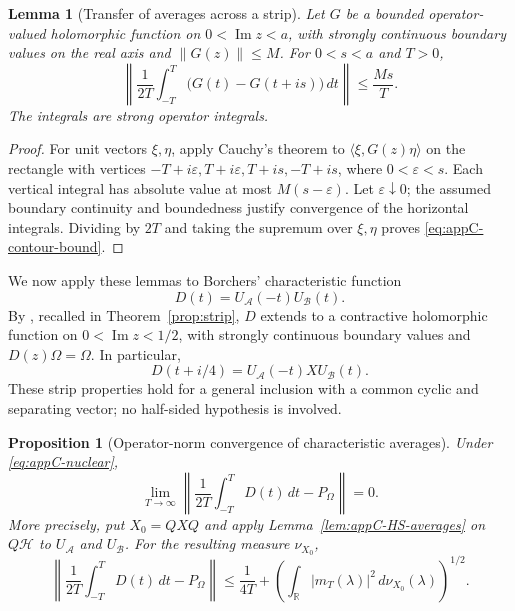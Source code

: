 \documentclass[a4paper,11pt]{article}
\newtheorem{lemma}[theorem]{Lemma}
\newtheorem{proposition}[theorem]{Proposition}
\theoremstyle{definition}
\begin{document}
\begin{lemma}[Transfer of averages across a strip]\label{lem:appC-strip-averages}
Let $G$ be a bounded operator-valued holomorphic function on $0<\operatorname{Im}z<a$, with strongly continuous boundary values on the real axis and $\|G(z)\|\le M$. For $0<s<a$ and $T>0$,
\begin{equation}
 \left\|\frac1{2T}\int_{-T}^{T}
 \bigl(G(t)-G(t+is)\bigr)\,dt\right\|\le\frac{Ms}{T}.
 \label{eq:appC-contour-bound}
\end{equation}
The integrals are strong operator integrals.
\end{lemma}

\begin{proof}
For unit vectors $\xi,\eta$, apply Cauchy's theorem to
$\langle\xi,G(z)\eta\rangle$ on the rectangle with vertices
$-T+i\varepsilon,T+i\varepsilon,T+is,-T+is$, where $0<\varepsilon<s$.
Each vertical integral has absolute value at most $M(s-\varepsilon)$.
Let $\varepsilon\downarrow0$; the assumed boundary continuity and boundedness justify convergence of the horizontal integrals. Dividing by $2T$ and taking the supremum over $\xi,\eta$ proves \eqref{eq:appC-contour-bound}.
\end{proof}

We now apply these lemmas to Borchers' characteristic function
\begin{equation}
 D(t)=U_{\mathcal A}(-t)U_{\mathcal B}(t).
 \label{eq:appC-characteristic}
\end{equation}
By \cite[Theorem~A in Section~II.2 and Lemma~II.3.2]{revolutionizing}, recalled in Theorem~\ref{prop:strip}, $D$ extends to a contractive holomorphic function on $0<\operatorname{Im}z<1/2$, with strongly continuous boundary values and $D(z)\Omega=\Omega$. In particular,
\begin{equation}
 D(t+i/4)=U_{\mathcal A}(-t)XU_{\mathcal B}(t).
 \label{eq:appC-shifted-characteristic}
\end{equation}
These strip properties hold for a general inclusion with a common cyclic and separating vector; no half-sided hypothesis is involved.

\begin{proposition}[Operator-norm convergence of characteristic averages]
\label{prop:appC-characteristic-mean}
Under \eqref{eq:appC-nuclear},
\begin{equation}
 \lim_{T\to\infty}
 \left\|\frac1{2T}\int_{-T}^{T}D(t)\,dt-P_\Omega\right\|=0 .
 \label{eq:appC-characteristic-mean}
\end{equation}
More precisely, put $X_0=QXQ$ and apply Lemma~\ref{lem:appC-HS-averages} on $Q\mathcal H$ to $U_{\mathcal A}$ and $U_{\mathcal B}$. For the resulting measure $\nu_{X_0}$,
\begin{equation}
 \left\|\frac1{2T}\int_{-T}^{T}D(t)\,dt-P_\Omega\right\|
 \le \frac1{4T}
 +\left(\int_{\mathbb R}|m_T(\lambda)|^2\,d\nu_{X_0}(\lambda)\right)^{1/2}.
 \label{eq:appC-quantitative-mean}
\end{equation}
\end{proposition}
\end{document}
